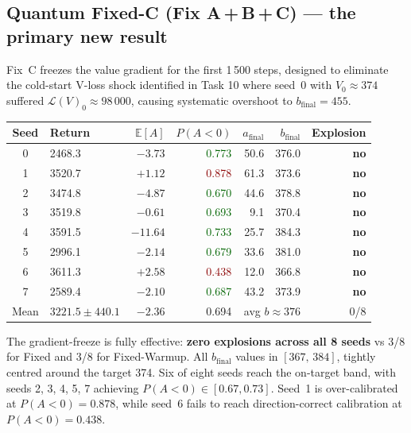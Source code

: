 \documentclass[10pt,a4paper]{article}
\begin{document}
\subsection{Quantum Fixed-C (Fix A\,+\,B\,+\,C) — the primary new result}
\label{sec:fixc}

Fix~C freezes the value gradient for the first 1\,500 steps, designed to
eliminate the cold-start V-loss shock identified in Task 10 where seed~0 with
$V_0\approx374$ suffered $\mathcal{L}(V)_0\approx98\,000$, causing systematic
overshoot to $b_\text{final}=455$.

\begin{center}
\setlength{\tabcolsep}{5pt}
\begin{tabular}{clrrrrr}
\toprule
\textbf{Seed} & \textbf{Return} & $\mathbb{E}[A]$ &
  $P(A{<}0)$ & $a_\text{final}$ & $b_\text{final}$ & Explosion \\
\midrule
0 & 2468.3 & $-3.73$ & \textcolor{darkgreen}{0.773} & 50.6 & 376.0 & \textbf{no} \\
1 & 3520.7 & $+1.12$ & \textcolor{darkred}{0.878} & 61.3 & 373.6 & \textbf{no} \\
2 & 3474.8 & $-4.87$ & \textcolor{darkgreen}{0.670} & 44.6 & 378.8 & \textbf{no} \\
3 & 3519.8 & $-0.61$ & \textcolor{darkgreen}{0.693} &  9.1 & 370.4 & \textbf{no} \\
4 & 3591.5 & $-11.64$& \textcolor{darkgreen}{0.733} & 25.7 & 384.3 & \textbf{no} \\
5 & 2996.1 & $-2.14$ & \textcolor{darkgreen}{0.679} & 33.6 & 381.0 & \textbf{no} \\
6 & 3611.3 & $+2.58$ & \textcolor{darkred}{0.438} & 12.0 & 366.8 & \textbf{no} \\
7 & 2589.4 & $-2.10$ & \textcolor{darkgreen}{0.687} & 43.2 & 373.9 & \textbf{no} \\
\midrule
Mean & $3221.5 \pm 440.1$ & $-2.36$ & 0.694 &
  \multicolumn{2}{r}{avg $b \approx 376$} & 0/8 \\
\bottomrule
\end{tabular}
\end{center}

The gradient-freeze is fully effective: \textbf{zero explosions across all 8
seeds} vs 3/8 for Fixed and 3/8 for Fixed-Warmup. All $b_\text{final}$ values
in $[367,\,384]$, tightly centred around the target 374. Six of eight seeds
reach the on-target band, with seeds 2, 3, 4, 5, 7 achieving $P(A<0)\in[0.67,0.73]$.
Seed~1 is over-calibrated at $P(A<0)=0.878$, while seed~6 fails to reach
direction-correct calibration at $P(A<0)=0.438$.
\end{document}
